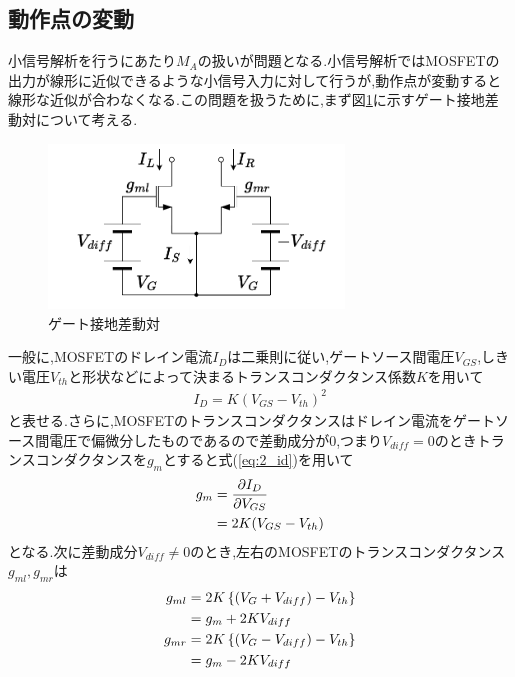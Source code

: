         \subsection{動作点の変動}   \label{ch:gilbert_valiable_gm}
            小信号解析を行うにあたり$M_{A}$の扱いが問題となる.小信号解析ではMOSFETの出力が線形に近似できるような小信号入力に対して行うが,動作点が変動すると線形な近似が合わなくなる.この問題を扱うために,まず図\ref{fig:2_OP}に示すゲート接地差動対について考える.\par
            \begin{figure}[!b]
                \begin{center}
                    \includegraphics[width=0.7\textwidth]{figures/chapter2/OperatingPoint.pdf}
                    \caption{ゲート接地差動対}
                    \label{fig:2_OP}
                \end{center}
            \end{figure}
            \clearpage
            一般に,MOSFETのドレイン電流$I_{D}$は二乗則に従い,ゲートソース間電圧$V_{GS}$,しきい電圧$V_{th}$と形状などによって決まるトランスコンダクタンス係数$K$を用いて
            \begin{align}
                I_{D}=K(V_{GS}-V_{th})^{2}  \label{eq:2_id}
            \end{align}
            と表せる.さらに,MOSFETのトランスコンダクタンスはドレイン電流をゲートソース間電圧で偏微分したものであるので差動成分が$0$,つまり$V_{diff}=0$のときトランスコンダクタンスを$g_{m}$とすると式(\ref{eq:2_id})を用いて
            \begin{align}
                g_{m}&=\frac{ \partial I_{D} }{ \partial V_{GS} }   \notag\\
                &=2K(V_{GS}-V_{th})     \label{eq:2_gm}
            \end{align}
            となる.次に差動成分$V_{diff}\neq0$のとき,左右のMOSFETのトランスコンダクタンス$g_{ml},g_{mr}$は
            \begin{align}
                g_{ml}&=2K\left\{ (V_{G}+V_{diff}) -V_{th} \right\}     \notag\\
                &=g_{m}+2KV_{diff}      \notag\\
                g_{mr}&=2K\left\{ (V_{G}-V_{diff}) -V_{th} \right\}     \notag\\
                &=g_{m}-2KV_{diff}      \notag
            \end{align}
